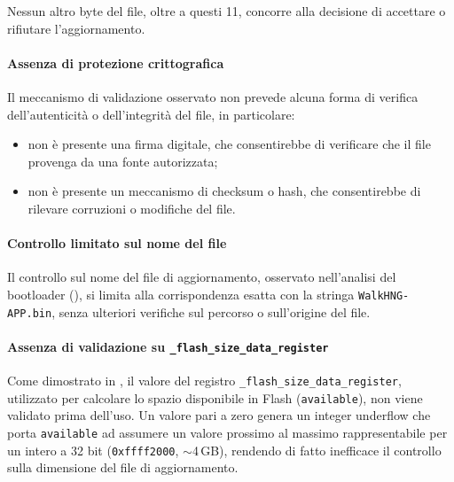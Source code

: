             Nessun altro byte del file, oltre a questi 11, concorre alla decisione 
            di accettare o rifiutare l'aggiornamento.
        
        \paragraph{Assenza di protezione crittografica}
            Il meccanismo di validazione osservato non prevede alcuna forma di 
            verifica dell'autenticità o dell'integrità del file, in particolare:
            
            \begin{itemize}[noitemsep]
                \item non è presente una firma digitale, che consentirebbe di 
                verificare che il file provenga da una fonte autorizzata;
                \item non è presente un meccanismo di checksum o hash, che 
                consentirebbe di rilevare corruzioni o modifiche del file.
            \end{itemize}
        
        \paragraph{Controllo limitato sul nome del file}
            Il controllo sul nome del file di aggiornamento, osservato nell'analisi 
            del bootloader (), si limita alla corrispondenza esatta con 
            la stringa \texttt{WalkHNG-APP.bin}, senza ulteriori verifiche sul 
            percorso o sull'origine del file.
        
        \paragraph{Assenza di validazione su \texttt{\_flash\_size\_data\_register}}
        
        Come dimostrato in , il valore del registro 
        \texttt{\_flash\_size\_data\_register}, utilizzato per calcolare lo 
        spazio disponibile in Flash (\texttt{available}), non viene validato 
        prima dell'uso. Un valore pari a zero genera un integer underflow che 
        porta \texttt{available} ad assumere un valore prossimo al massimo 
        rappresentabile per un intero a 32 bit (\texttt{0xffff2000}, 
        $\sim$4\,GB), rendendo di fatto inefficace il controllo sulla 
        dimensione del file di aggiornamento.

